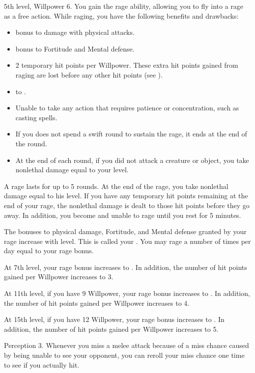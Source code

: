     \featpres 5th level, Willpower 6.
    \featben You gain the rage ability, allowing you to fly into a rage as a free action.
    While raging, you have the following benefits and drawbacks:
    \begin{itemize}
        \item {} bonus to damage with physical attacks.
        \item {} bonus to Fortitude and Mental defense.
        \item 2 temporary hit points per Willpower.
            These extra hit points gained from raging are lost before any other hit points (see ).
        \item {} to .
        \item Unable to take any action that requires patience or concentration, such as casting spells.
        \item If you does not spend a swift round to sustain the rage, it ends at the end of the round.
        \item At the end of each round, if you did not attack a creature or object, you take nonlethal damage equal to your level.
    \end{itemize}

    A rage lasts for up to 5 rounds.
    At the end of the rage, you take nonlethal damage equal to his level.
    If you have any temporary hit points remaining at the end of your rage, the nonlethal damage is dealt to those hit points before they go away.
    In addition, you become \fatigued and unable to rage until you rest for 5 minutes.

    The bonuses to physical damage, Fortitude, and Mental defense granted by your rage increase with level.
    This is called your .
    You may rage a number of times per day equal to your rage bonus.

    At 7th level, your rage bonus increases to .
    In addition, the number of hit points gained per Willpower increases to 3.

    At 11th level, if you have 9 Willpower, your rage bonus increases to .
    In addition, the number of hit points gained per Willpower increases to 4.

    At 15th level, if you have 12 Willpower, your rage bonus increases to .
    In addition, the number of hit points gained per Willpower increases to 5.

    \featpre Perception 3.
    \featben Whenever you miss a melee attack because of a miss chance caused by being unable to see your opponent, you can reroll your miss chance one time to see if you actually hit.

